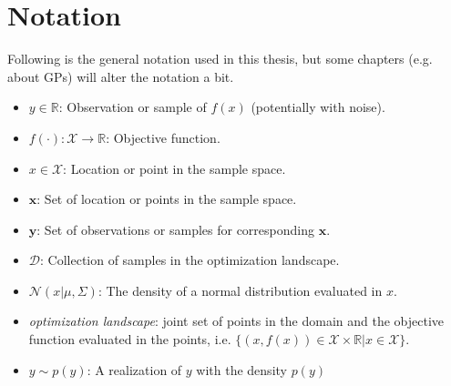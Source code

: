 

\section{Notation}
Following is the general notation used in this thesis, but some chapters (e.g. about GPs) will alter the notation a bit. 
\begin{itemize}[noitemsep]
    \item $y \in \mathbb{R}$: Observation or sample of $f(x)$ (potentially with noise).
    \item $f(\cdot): \mathcal{X} \rightarrow \mathbb{R}$: Objective function.
    \item $x \in \mathcal{X}$: Location or point in the sample space.
    \item $\textbf{x}$: Set of location or points in the sample space.
    \item $\textbf{y}$: Set of observations or samples for corresponding $\textbf{x}$.
    \item $\mathcal{D}$: Collection of samples in the optimization landscape. 
    \item $\mathcal{N}(x|\mu, \Sigma)$: The density of a normal distribution evaluated in $x$.
    \item \textit{optimization landscape}: joint set of points in the domain and the objective function
    evaluated in the points, i.e. $\{(x,f(x))\in \mathcal{X} \times \mathbb{R}| x \in \mathcal{X}\}$.
    \item $y \sim p(y)$: A realization of $y$ with the density $p(y)$
\end{itemize}

